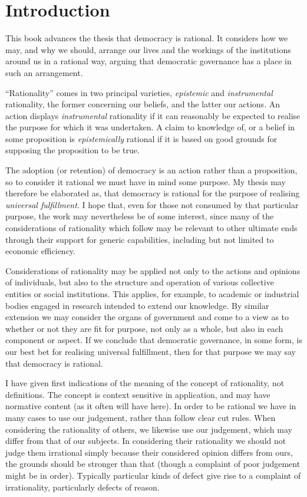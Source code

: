 \mainmatter
\chapter{Introduction}

This book advances the thesis that democracy is rational.
It considers how we may, and why we should, arrange our lives and the workings of the institutions around us in a rational way, arguing that democratic governance has a place in such an arrangement.

``Rationality'' comes in two principal varieties, \emph{epistemic} and \emph{instrumental} rationality, the former concerning our beliefs, and the latter our actions.
An action displays \emph{instrumental} rationality if it can reasonably be expected to realise the purpose for which it was undertaken.
A claim to knowledge of, or a belief in some proposition is \emph{epistemically} rational if it is based on good grounds for supposing the proposition to be true.

The adoption (or retention) of democracy is an action rather than a  proposition, so to consider it rational we must have in mind some purpose.
My thesis may therefore be elaborated as, that democracy is rational for the purpose of realising \emph{universal fulfillment}.
I hope that, even for those not consumed by that particular purpose, the work may nevertheless be of some interest, since many of the considerations of rationality which follow may be relevant to other ultimate ends through their support for generic capabilities, including but not limited to economic efficiency.

Considerations of rationality may be applied not only to the actions and opinions of individuals, but also to the structure and operation of various collective entities or social institutions.
This applies, for example, to academic or industrial bodies engaged in research intended to extend our knowledge.
By similar extension we may consider the organs of government and come to a view as to whether or not they are fit for purpose, not only as a whole, but also in each component or aspect.
If we conclude that democratic governance, in some form, is our best bet for realising universal fulfillment, then for that purpose we may say that democracy is rational.

I have given first indications of the meaning of the concept of rationality, not definitions.
The concept is context sensitive in application, and may have normative content (as it often will have here).
In order to be rational we have in many cases to use our judgement, rather than follow clear cut rules.
When considering the rationality of others, we likewise use our judgement, which may differ from that of our subjects.
In considering their rationality we should not judge them irrational simply because their considered opinion differs from ours, the grounds should be stronger than that (though a complaint of poor judgement might be in order).
Typically particular kinds of defect give rise to a complaint of irrationality, particularly defects of reason.

